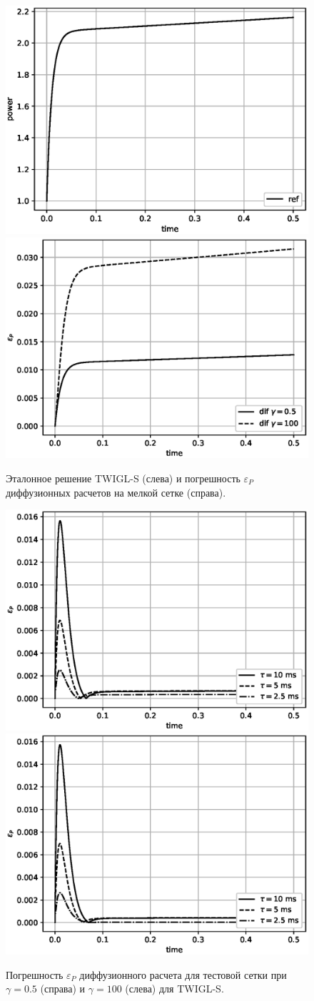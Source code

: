 \documentclass{crm-article}
\begin{document}
\begin{figure}[ht]
\begin{center}
	\includegraphics[width=0.4\linewidth]{sp3_ref_s.eps}\hspace{20pt}
	\includegraphics[width=0.4\linewidth]{odds_s.eps}\\
	\caption{\label{image:canonsummary} Эталонное решение TWIGL-S (слева) и погрешность $\varepsilon_P$ диффузионных расчетов на мелкой сетке (справа).}
	\label{ris:sp3_ref_s}
\end{center}
\end{figure}

\begin{figure}[ht]
\begin{center}
	\includegraphics[width=0.4\linewidth]{dif_tau_s.eps}\hspace{20pt}
	\includegraphics[width=0.4\linewidth]{dif_tau_s_100.eps}\\
	\caption{\label{image:canonsummary} Погрешность $\varepsilon_P$ диффузионного расчета для тестовой сетки при $\gamma=0.5$ (справа) и $\gamma=100$ (слева) для TWIGL-S.}
	\label{ris:dif_tau_s}
\end{center}
\end{figure}
\end{document}
